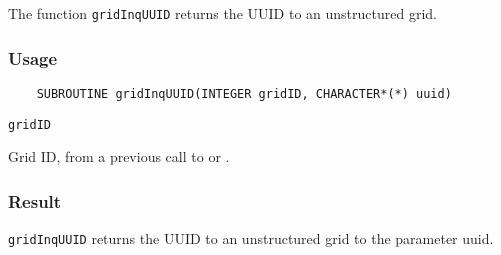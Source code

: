 The function {\tt gridInqUUID} returns the UUID to an unstructured grid.

\subsubsection*{Usage}

\begin{verbatim}
    SUBROUTINE gridInqUUID(INTEGER gridID, CHARACTER*(*) uuid)
\end{verbatim}

\hspace*{4mm}\begin{minipage}[]{15cm}
\begin{deflist}{\tt gridID\ }
\item[{\tt gridID}]
Grid ID, from a previous call to {} or {}.

\end{deflist}
\end{minipage}

\subsubsection*{Result}

{\tt gridInqUUID} returns the UUID to an unstructured grid to the parameter uuid.
